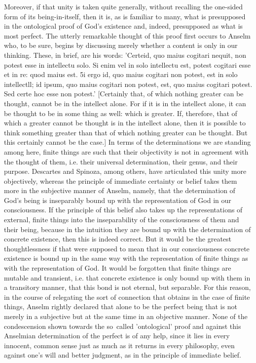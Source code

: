 Moreover, if that unity is taken quite generally,
without recalling the one-sided form of its being-in-itself,
then it is, as is familiar to many,
what is presupposed in the ontological proof of God's existence
and, indeed, presupposed as what is most perfect.
The utterly remarkable thought of this proof
first occurs to Anselm who, to be sure,
begins by discussing merely whether a content is
only in our thinking.
These, in brief, are his words:
'Certeid, quo maius cogitari nequit,
non potest esse in intellectu solo. Si enim vel in solo
intellectu est, potest cogitari esse et in re: quod maius est. 5i ergo id,
quo maius cogitari non potest, est in solo intellectll; id ipsum, quo
maius cogitari non potest, est, quo maius cogitari potest. Sed certe
hoc esse non potest.'
[Certainly that, of which nothing greater can be thought,
cannot be in the intellect alone.
For if it is in the intellect alone,
it can be thought to be in some thing as well:
which is greater.
If, therefore, that of which a greater cannot be thought is
in the intellect alone, then it is possible to think something greater
than that of which nothing greater can be thought. But this certainly
cannot be the case.]
In terms of the determinations we are
standing among here, finite things are such that their objectivity is
not in agreement with the thought of them, i.e. their universal
determination, their genus, and their purpose. Descartes and
Spinoza, among others, have articulated this unity more objectively,
whereas the principle of immediate certainty or belief takes them
more in the subjective manner of Anselm, namely, that the
determination of God's being is inseparably bound up with the
representation of God in our consciousness. If the principle of this
belief also takes up the representations of external, finite
things into the inseparability of the consciousness of them and
their being, because in the intuition they are bound up with the
determination of concrete existence, then this is indeed correct. But
it would be the greatest thoughtlessness if that were supposed to
mean that in our consciousness concrete existence is bound up in
the same way with the representation of finite things as with the
representation of God. It would be forgotten that finite things are
mutable and transient, i.e. that concrete existence is only bound up
with them in a transitory manner, that this bond is not eternal, but
separable. For this reason, in the course of relegating the sort of
connection that obtains in the case of finite things,
Anselm rightly declared that alone to be the perfect being that is not
merely in a subjective but at the same time in an objective manner.
None of the condescension shown towards the so~called 'ontological'
proof and against this Anselmian determination of the perfect is of
any help, since it lies in every innocent, common sense just as much
as it returns in every philosophy, even against one's will and better
judgment, as in the principle of immediate belief.

